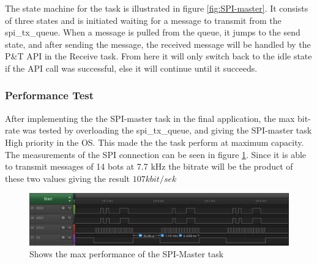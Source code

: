 The state machine for the task is illustrated in figure \ref{fig:SPI-master}. It consists of three states and is initiated waiting for a message to transmit from the spi\_tx\_queue. When a message is pulled from the queue, it jumps to the send state, and after sending the message, the received message will be handled by the P\&T API in the Receive task. From here it will only switch back to the idle state if the API call was successful, else it will continue until it succeeds. 


\subsubsection{Performance Test} 
\label{sec:PerformanceTest}
After implementing the the SPI-master task in the final application, the max bit-rate was tested by overloading the spi\_tx\_queue, and giving the SPI-master task High priority in the OS. This made the the task perform at maximum capacity. The measurements of the SPI connection can be seen in figure \ref{fig:HightPerformance}. Since it is able to transmit messages of 14 bots at 7.7 kHz the bitrate will be the product of these two values giving the result $107 kbit/sek$


\begin{figure}
	\centering
	\includegraphics[scale = 0.7] {Billeder/HightPerformance}
	\caption{Shows the max performance of the SPI-Master task}
	\label{fig:HightPerformance}
\end{figure}
 